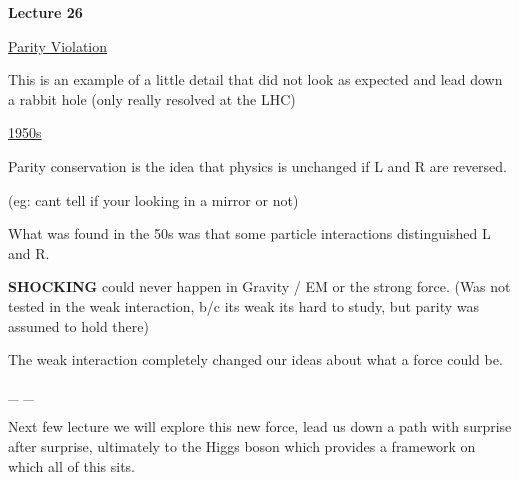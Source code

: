 
\usepackage{braket}
\usepackage{bbm}
\usepackage{relsize}
\usepackage{tcolorbox}




\usepackage{fancyhdr}

\fancyhf{}


\thispagestyle{fancy}

\begin{center}
{\huge \textbf{Lecture 26}}
\end{center}

{\fontsize{14}{16}\selectfont

\underline{\underline{Parity Violation}} 

This is an example of a little detail that did not look as expected and lead down a rabbit hole (only really resolved at the LHC) 


\underline{1950s}

Parity conservation is the idea that physics is unchanged if L and R are reversed. 

(eg: cant tell if your looking in a mirror or not)

What was found in the 50s was that some particle interactions distinguished L and R. 

\textbf{SHOCKING} could never happen in Gravity / EM or the strong force. 
(Was not tested in the weak interaction, b/c its weak its hard to study, but parity was assumed to hold there)

The weak interaction completely changed our ideas about what a force could be.


\be
{}  \underbrace{\rightarrow}_{}  \underbrace{\rightarrow}_{} 
\ee


Next few lecture we will explore this new force, lead us down a path with surprise after surprise, ultimately to the Higgs boson which provides a framework on which all of this sits. 


\lineacross

\clearpage

}
